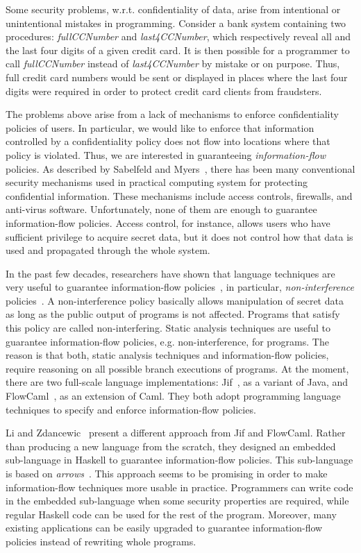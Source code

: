 \documentclass[a4paper]{report}
\begin{document}
Some security problems, w.r.t. confidentiality of data,
arise from intentional or unintentional mistakes in programming.
Consider a bank system containing two procedures:
 \emph{fullCCNumber} and \emph{last4CCNumber}, which respectively reveal 
all and the last four digits of a given credit card. It is then
possible for a programmer to call \emph{fullCCNumber} instead of 
\emph{last4CCNumber} by mistake or on purpose. Thus, full credit card numbers would be 
sent or displayed in places where the last four digits were 
required in order to protect credit card clients from fraudsters.

The problems above arise from a lack of mechanisms to enforce
confidentiality policies of users. In particular, we would like to
enforce that information controlled by a confidentiality policy does 
not flow into locations where that policy is violated. Thus, we are 
interested in guaranteeing \emph{information-flow}
policies. As described by Sabelfeld and Myers~\cite{Sabelfeld:Myers:JSAC},
there has been many conventional security mechanisms used in practical 
computing system for protecting confidential information. These
mechanisms include access controls, 
firewalls, and anti-virus software. Unfortunately, none of them  
are enough to guarantee information-flow policies. 
Access control, for instance, allows users who have sufficient 
privilege to acquire secret data, but it does not control how that data is 
used and propagated through the whole system. 

In the past few decades, researchers have shown that language
techniques are 
very useful to guarantee information-flow policies~\cite{Sabelfeld:Myers:JSAC}, in
particular, \emph{non-interference} policies~\cite{Goguen:Meseguer:Noninterference}. 
A non-interference policy basically allows manipulation of secret data 
as long as the public output of programs is not affected. 
Programs that satisfy this policy are called non-interfering. 
Static analysis techniques are useful to guarantee information-flow
policies, e.g. non-interference, for programs. The reason
is that both, static analysis techniques and information-flow 
policies, require reasoning on all possible branch executions of
programs.  At the moment, there are two full-scale language
implementations: Jif~\cite{jif}, as a variant of Java, and
FlowCaml~\cite{FlowCaml}, as an extension of Caml. They both adopt
programming language techniques to specify and enforce 
information-flow policies.

Li and Zdancewic~\cite{Li:Zdancewic:CSFW} present a different
approach from Jif and FlowCaml. 
Rather than producing a new language from the scratch, 
they designed an embedded sub-language in Haskell to 
guarantee information-flow policies. This sub-language is based on 
{\em arrows}~\cite{Hughes:SCP00}. This approach seems to be promising 
in order to make information-flow techniques more usable in practice.
Programmers can write code in the 
embedded sub-language when some security properties are required,  
while regular Haskell code can be used for the rest of the program.
Moreover, many existing applications can be easily upgraded
to guarantee information-flow policies instead of 
rewriting whole programs.
\end{document}
